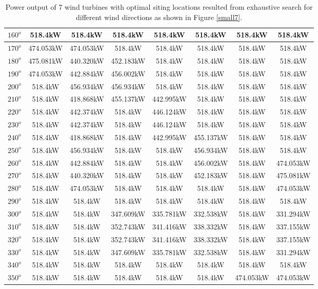 \begin{table}[H]
\begin{tabular}{|c|c|c|c|c|c|c|c|}
        		$160^o$	& 518.4kW	& 518.4kW	& 518.4kW	& 518.4kW	& 518.4kW	& 518.4kW	& 518.4kW	\\ \hline
        		$170^o$	& 474.053kW	& 474.053kW	& 518.4kW	& 518.4kW	& 518.4kW	& 518.4kW	& 518.4kW	\\ \hline
        		$180^o$	& 475.081kW	& 440.320kW	& 452.183kW	& 518.4kW	& 518.4kW	& 518.4kW	& 518.4kW	\\ \hline
        		$190^o$	& 474.053kW	& 442.884kW	& 456.002kW	& 518.4kW	& 518.4kW	& 518.4kW	& 518.4kW	\\ \hline
        		$200^o$	& 518.4kW	& 456.934kW	& 456.934kW	& 518.4kW	& 518.4kW	& 518.4kW	& 518.4kW	\\ \hline
        		$210^o$	& 518.4kW	& 418.868kW	& 455.137kW	& 442.995kW	& 518.4kW	& 518.4kW	& 518.4kW	\\ \hline
        		$220^o$	& 518.4kW	& 442.374kW	& 518.4kW	& 446.124kW	& 518.4kW	& 518.4kW	& 518.4kW	\\ \hline
        		$230^o$	& 518.4kW	& 442.374kW	& 518.4kW	& 446.124kW	& 518.4kW	& 518.4kW	& 518.4kW	\\ \hline
        		$240^o$	& 518.4kW	& 418.868kW	& 518.4kW	& 442.995kW	& 455.137kW	& 518.4kW	& 518.4kW	\\ \hline
        		$250^o$	& 518.4kW	& 456.934kW	& 518.4kW	& 518.4kW	& 456.934kW	& 518.4kW	& 518.4kW	\\ \hline
        		$260^o$	& 518.4kW	& 442.884kW	& 518.4kW	& 518.4kW	& 456.002kW	& 518.4kW	& 474.053kW	\\ \hline
        		$270^o$	& 518.4kW	& 440.320kW	& 518.4kW	& 518.4kW	& 452.183kW	& 518.4kW	& 475.081kW	\\ \hline
        		$280^o$	& 518.4kW	& 474.053kW	& 518.4kW	& 518.4kW	& 518.4kW	& 518.4kW	& 474.053kW	\\ \hline
        		$290^o$	& 518.4kW	& 518.4kW	& 518.4kW	& 518.4kW	& 518.4kW	& 518.4kW	& 518.4kW	\\ \hline
        		$300^o$	& 518.4kW	& 518.4kW	& 347.609kW	& 335.781kW	& 332.538kW	& 518.4kW	& 331.294kW	\\ \hline
        		$310^o$	& 518.4kW	& 518.4kW	& 352.743kW	& 341.416kW	& 338.332kW	& 518.4kW	& 337.155kW	\\ \hline
        		$320^o$	& 518.4kW	& 518.4kW	& 352.743kW	& 341.416kW	& 338.332kW	& 518.4kW	& 337.155kW	\\ \hline
        		$330^o$	& 518.4kW	& 518.4kW	& 347.609kW	& 335.781kW	& 332.538kW	& 518.4kW	& 331.294kW	\\ \hline
        		$340^o$	& 518.4kW	& 518.4kW	& 518.4kW	& 518.4kW	& 518.4kW	& 518.4kW	& 518.4kW	\\ \hline
        		$350^o$	& 518.4kW	& 518.4kW	& 518.4kW	& 518.4kW	& 518.4kW	& 474.053kW	& 474.053kW	\\ \hline
        	\end{tabular}
        	\caption{Power output of 7 wind turbines with optimal siting locations resulted from exhaustive search for different wind directions as shown in Figure \ref{small7}.}
        	\label{table7}
        \end{table}
        \doublespacing
        
